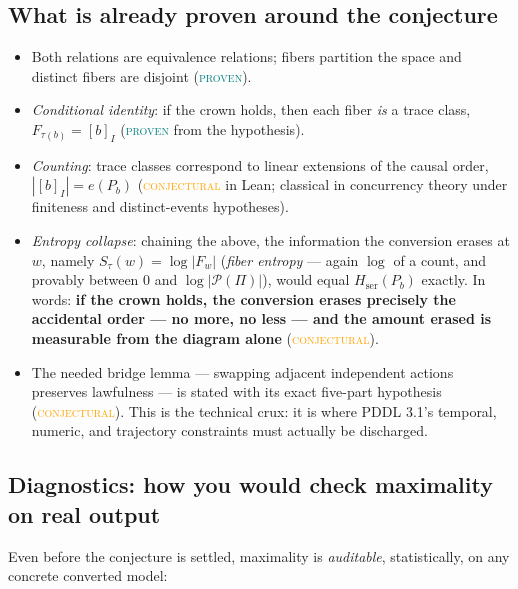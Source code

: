 \documentclass[11pt]{article}
\newcommand{\PROVEN}{\textcolor{teal}{\textsc{proven}}}
\newcommand{\CONJECTURAL}{\textcolor{orange}{\textsc{conjectural}}}
\theoremstyle{definition}
\theoremstyle{plain}
\theoremstyle{remark}
\begin{document}
\subsection{What is already proven around the conjecture}

\begin{itemize}[nosep]
  \item Both relations are equivalence relations; fibers partition the space
  and distinct fibers are disjoint (\PROVEN).
  \item \emph{Conditional identity}: if the crown holds, then each fiber
  \emph{is} a trace class, $F_{\tau(b)} = [b]_I$ (\PROVEN{} from the
  hypothesis).
  \item \emph{Counting}: trace classes correspond to linear extensions of
  the causal order, $|[b]_I| = e(P_b)$ (\CONJECTURAL{} in Lean; classical in
  concurrency theory under finiteness and distinct-events hypotheses).
  \item \emph{Entropy collapse}: chaining the above, the information the
  conversion erases at $w$, namely $S_\tau(w) = \log|F_w|$ (\emph{fiber
  entropy} --- again $\log$ of a count, and provably between $0$ and
  $\log|\mathcal{P}(\Pi)|$), would equal $H_{\mathrm{ser}}(P_b)$
  exactly. In words: \textbf{if the crown holds, the conversion erases
  precisely the accidental order --- no more, no less --- and the amount
  erased is measurable from the diagram alone} (\CONJECTURAL).
  \item The needed bridge lemma --- swapping adjacent independent actions
  preserves lawfulness --- is stated with its exact five-part hypothesis
  (\CONJECTURAL). This is the technical crux: it is where PDDL 3.1's
  temporal, numeric, and trajectory constraints must actually be
  discharged.
\end{itemize}

\subsection{Diagnostics: how you would check maximality on real output}

Even before the conjecture is settled, maximality is \emph{auditable},
statistically, on any concrete converted model:
\end{document}
